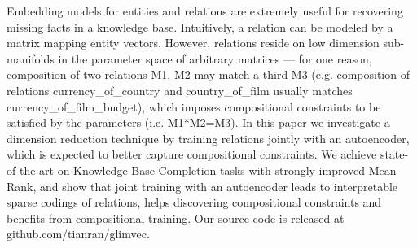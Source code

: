 Embedding models for entities and relations are extremely useful for recovering missing facts in a knowledge base. Intuitively, a relation can be modeled by a matrix mapping entity vectors. However, relations reside on low dimension sub-manifolds in the parameter space of arbitrary matrices --- for one reason, composition of two relations M1, M2 may match a third M3 (e.g. composition of relations currency\_of\_country and country\_of\_film usually matches currency\_of\_film\_budget), which imposes compositional constraints to be satisfied by the parameters (i.e. M1*M2=M3). In this paper we investigate a dimension reduction technique by training relations jointly with an autoencoder, which is expected to better capture compositional constraints. We achieve state-of-the-art on Knowledge Base Completion tasks with strongly improved Mean Rank, and show that joint training with an autoencoder leads to interpretable sparse codings of relations, helps discovering compositional constraints and benefits from compositional training. Our source code is released at github.com/tianran/glimvec.
